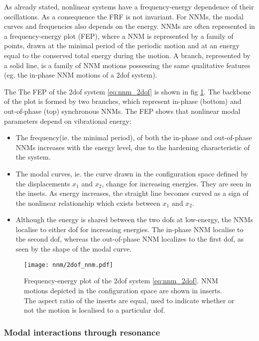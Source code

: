 As already stated, nonlinear systems have a frequency-energy dependence of their
oscillations. As a consequence the FRF is not invariant. For NNMs, the modal
curves and frequencies also depends on the energy.
NNMs are often represented in a frequency-energy plot (FEP), where a NNM is
represented by a family of points, drawn at the minimal period of the periodic
motion and at an energy equal to the conserved total energy during the motion. A
branch, represented by a solid line, is a family of NNM motions possessing the
same qualitative features (eg. the in-phase NNM motions of a 2dof system).

The The FEP of the 2dof system \eqref{eq:nnm_2dof} is shown in fig
\ref{fig:nnm_fep}. The backbone of the plot is formed by two branches, which
represent in-phase (bottom) and out-of-phase (top) synchronous NNMs. The FEP
shows that nonlinear modal parameters depend on vibrational energy:

\begin{itemize}
\item The frequency(ie. the minimal period), of both the in-phase and
  out-of-phase NNMs increases with the energy level, due to the hardening
  characteristic of the system.
\item The modal curves, ie. the curve drawn in the configuration space defined
  by the displacements $x_1$ and $x_2$, change for increasing energies. They are
  seen in the insets. As energy increases, the straight line becomes curved as a
  sign of the nonlinear relationship which exists between $x_1$ and $x_2$.
\item Although the energy is shared between the two dofs at low-energy, the NNMs
  localise to either dof for increasing energies. The in-phase NNM localise to
  the second dof, whereas the out-of-phase NNM localizes to the first dof, as
  seen by the shape of the modal curve.
\end{itemize}

\begin{figure}[!ht]
  \centering
  \texttt{[image: nnm/2dof\_nnm.pdf]}
  \caption{Frequency-energy plot of the 2dof system \eqref{eq:nnm_2dof}.
    NNM motions depicted in the configuration space are shown in inserts.
    The aspect ratio of the inserts are equal, used to indicate whether or
    not the motion is localised to a particular dof.}
  \label{fig:nnm_fep}
\end{figure}


\subsubsection{Modal interactions through resonance}

